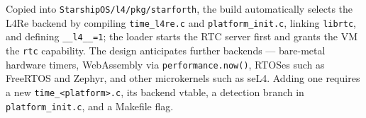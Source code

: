 Copied into \texttt{StarshipOS/l4/pkg/starforth}, the build automatically
selects the L4Re backend by compiling \texttt{time\_l4re.c} and
\texttt{platform\_init.c}, linking \texttt{librtc}, and defining
\texttt{\_\_l4\_\_=1}; the loader starts the RTC server first and grants the VM
the \texttt{rtc} capability. The design anticipates further backends ---
bare-metal hardware timers, WebAssembly via \texttt{performance.now()}, RTOSes
such as FreeRTOS and Zephyr, and other microkernels such as seL4. Adding one
requires a new \texttt{time\_<platform>.c}, its backend vtable, a detection
branch in \texttt{platform\_init.c}, and a Makefile flag.
